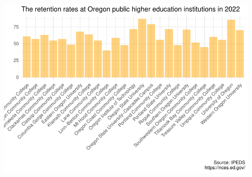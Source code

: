 \documentclass[
]{article}
\begin{document}
\includegraphics{Final_files/figure-latex/unnamed-chunk-2-1.pdf}
\end{document}
